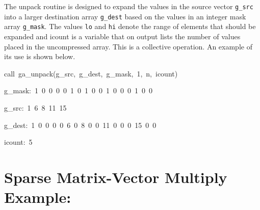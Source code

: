The unpack routine is designed to expand the values in the source
vector \texttt{g\_src} into a larger destination array \texttt{g\_dest}
based on the values in an integer mask array \texttt{g\_mask}. The
values \texttt{lo} and \texttt{hi} denote the range of elements that
should be expanded and icount is a variable that on output lists the
number of values placed in the uncompressed array. This is a collective
operation. An example of its use is shown below.
\begin{lyxcode}
call~ga\_unpack(g\_src,~g\_dest,~g\_mask,~1,~n,~icount)~

g\_mask:~1~0~0~0~0~1~0~1~0~0~1~0~0~0~1~0~0~

g\_src:~1~6~8~11~15~

g\_dest:~1~0~0~0~0~6~0~8~0~0~11~0~0~0~15~0~0~

icount:~5
\end{lyxcode}

\section{Sparse Matrix-Vector Multiply Example:}

